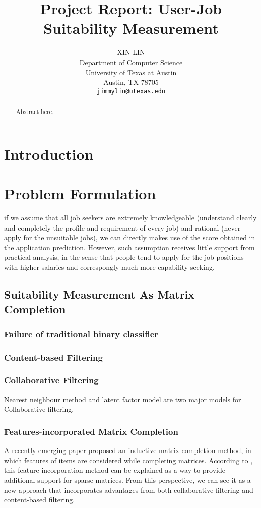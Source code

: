 \documentclass{article} %
\title{Project Report: User-Job Suitability Measurement}
\author{
XIN LIN \\
Department of Computer Science\\
University of Texas at Austin \\
Austin, TX 78705 \\
\texttt{jimmylin@utexas.edu} \\
}
\begin{document}
\maketitle

\begin{abstract}
    Abstract here.
\end{abstract}

\section{Introduction}

\section{Problem Formulation}

if we assume that all job seekers are extremely knowledgeable (understand
clearly and completely the profile and requirement of every job) and rational
(never apply for the unsuitable jobs), we can directly makes use of the score
obtained in the application prediction. However, such assumption receives
little support from practical analysis, in the sense that people tend to apply
for the job positions with higher salaries and correspongly much more
capability seeking.

\subsection{Suitability Measurement As Matrix Completion}
\subsubsection{Failure of traditional binary classifier}

\subsubsection{Content-based Filtering}

\subsubsection{Collaborative Filtering}
Nearest neighbour method and latent factor model are two major models for
Collaborative filtering.
\subsubsection{Features-incorporated Matrix Completion}
A recently emerging paper proposed an inductive matrix completion method, in
which features of items are considered while completing matrices. 
According to \cite{IMC}, this feature incorporation method can be explained as a way to
provide additional support for sparse matrices. 
From this perspective, we can see it as a new approach that incorporates
advantages from both collaborative filtering and content-based filtering. 
\end{document}
